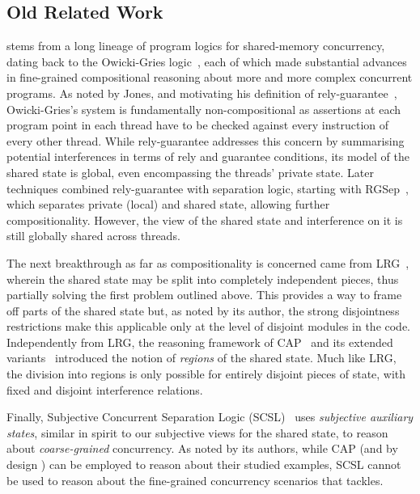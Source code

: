 \subsection{Old Related Work}
\colosl stems from a long lineage of program logics for shared-memory
concurrency, dating back to the Owicki-Gries logic~\cite{owicki}, each of
which made substantial advances in fine-grained compositional
reasoning about more and more complex concurrent programs. As noted by
Jones, and motivating his definition of rely-guarantee~\cite{rg},
Owicki-Gries's system is fundamentally non-compositional as assertions
at each program point in each thread have to be checked against every
instruction of every other thread. While rely-guarantee addresses
this concern by summarising potential interferences in terms of rely
and guarantee conditions, its model of the shared state is global,
even encompassing the threads' private state. Later techniques
combined rely-guarantee with separation logic, starting with
RGSep~\cite{viktor-marriage}, which separates private (local) and
shared state, allowing further compositionality. However, the view of
the shared state and interference on it is still globally shared
across threads. 

The next breakthrough as far as compositionality is
concerned came from LRG~\cite{lrg}, wherein the shared state may be
split into completely independent pieces, thus partially solving the
first problem outlined above. This provides a way to frame off parts
of the shared state but, as noted by its author, the strong
disjointness restrictions make this applicable only at the level of
disjoint modules in the code. Independently from LRG, the reasoning
framework of CAP~\cite{cap-ecoop10}
and its extended variants~\cite{icap,tada} introduced the notion
of \emph{regions} of the shared state. Much like LRG, the division into
regions is only possible for entirely disjoint pieces of state, with
fixed and disjoint interference relations.

Finally, Subjective Concurrent Separation Logic (SCSL)~\cite{SCSL}
uses \emph{subjective auxiliary states}, similar in spirit to our
subjective views for the shared state, to reason about \emph{coarse-grained}
concurrency. As noted by its authors, while CAP (and by design \colosl) can
be employed to reason about their studied examples, SCSL cannot be
used to reason about the fine-grained concurrency scenarios that \colosl tackles.
